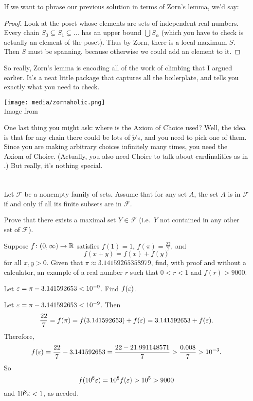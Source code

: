 If we want to phrase our previous solution in terms of Zorn's lemma, we'd say:
\begin{proof}
	Look at the poset whose elements are sets of independent real numbers.
	Every chain $S_0 \subsetneq S_1 \subsetneq \dots$ has an upper bound $\bigcup S_\alpha$
	(which you have to check is actually an element of the poset).
	Thus by Zorn, there is a local maximum $S$.
	Then $S$ must be spanning, because otherwise we could add an element to it.
\end{proof}
So really, Zorn's lemma is encoding all of the work of climbing that I argued earlier.
It's a neat little package that captures all the boilerplate, and tells
you exactly what you need to check.

\begin{center}
	\texttt{[image: media/zornaholic.png]}
	\\ \scriptsize Image from \cite{img:zornaholic}
\end{center}

One last thing you might ask:
where is the Axiom of Choice used?
Well, the idea is that for any chain there could be lots of $\tilde p$'s,
and you need to pick one of them.
Since you are making arbitrary choices infinitely many times, you need the Axiom of Choice.
(Actually, you also need Choice to talk about cardinalities as in
.)
But really, it's nothing special.

\section{\problemhead}
\begin{problem}
	Let $\mathcal F$ be a nonempty family of sets.
	Assume that for any set $A$,
	the set $A$ is in $\mathcal F$
	if and only if all its finite subsets are in $\mathcal F$.

	Prove that there exists a maximal set $Y \in \mathcal F$
	(i.e.\ $Y$ not contained in any other set of $\mathcal F$).
\end{problem}

\begin{problem}
	Suppose $f \colon (0,\infty) \to \mathbb R$ satisfies
	$f(1)=1$, $f(\pi) = \frac{22}{7}$, and
	\[ f(x+y) = f(x) + f(y) \]
	for all $x,y > 0$.
	Given that $\pi \approx 3.14159265358979$,
	find, with proof and without a calculator,
	an example of a real number $r$ such that $0 < r < 1$ and $f(r) > 9000$.
	\begin{hint}
		Let $\varepsilon = \pi - 3.141592653 < 10^{-9}$. Find $f(\varepsilon)$.
	\end{hint}
	\begin{sol}
		Let $\varepsilon = \pi - 3.141592653 < 10^{-9}$.
		Then
		\[ \frac{22}{7} = f(\pi) = f(3.141592653) + f(\varepsilon) = 3.141592653 + f(\varepsilon). \]
		Therefore,
		\[ f(\varepsilon) = \frac{22}{7} - 3.141592653
			= \frac{22 - 21.991148571}{7} > \frac{0.008}{7} > 10^{-3}. \]
		So
		\[ f(10^8 \varepsilon) = 10^8 f(\varepsilon) > 10^5 > 9000 \]
		and $10^8 \varepsilon < 1$, as needed.
	\end{sol}
\end{problem}

